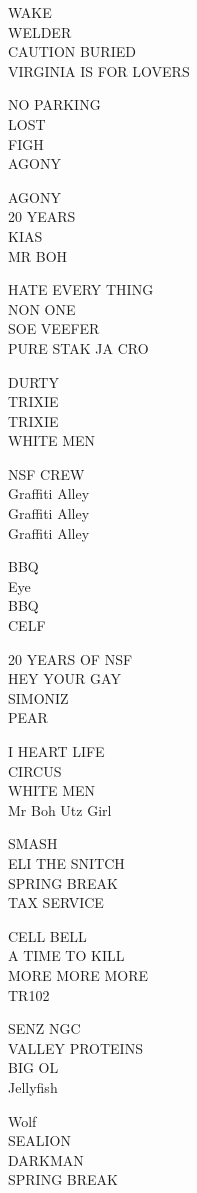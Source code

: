 \documentclass[10pt,letterpaper]{article}
\begin{document}
WAKE\\
WELDER\\
CAUTION BURIED\\
VIRGINIA IS FOR LOVERS

NO PARKING\\
LOST\\
FIGH\\
AGONY

AGONY\\
20 YEARS\\
KIAS\\
MR BOH

HATE EVERY THING\\
NON ONE\\
SOE VEEFER\\
PURE STAK JA CRO

DURTY\\
TRIXIE\\
TRIXIE\\
WHITE MEN

NSF CREW\\
Graffiti Alley\\
Graffiti Alley\\
Graffiti Alley

BBQ\\
Eye\\
BBQ\\
CELF

20 YEARS OF NSF\\
HEY YOUR GAY\\
SIMONIZ\\
PEAR

I HEART LIFE\\
CIRCUS\\
WHITE MEN\\
Mr Boh Utz Girl

SMASH\\
ELI THE SNITCH\\
SPRING BREAK\\
TAX SERVICE

CELL BELL\\
A TIME TO KILL\\
MORE MORE MORE\\
TR102

SENZ NGC\\
VALLEY PROTEINS\\
BIG OL\\
Jellyfish

Wolf\\
SEALION\\
DARKMAN\\
SPRING BREAK
\end{document}

